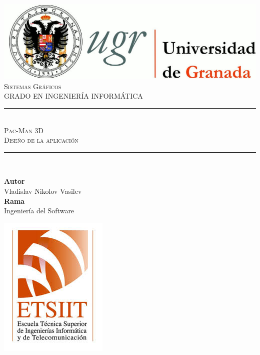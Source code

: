 \documentclass[11pt,a4paper]{article}
\newcommand{\asignatura}{Sistemas Gráficos}
\newcommand{\autor}{Vladislav Nikolov Vasilev}
\newcommand{\titulo}{Pac-Man 3D}
\newcommand{\subtitulo}{Diseño de la aplicación}
\newcommand{\rama}{Ingeniería del Software}
\begin{document}

\begin{titlepage}

\begin{minipage}{\textwidth}

\centering

\includegraphics[scale=0.3]{img/logo_ugr.jpg}\\[1cm]

\textsc{\Large \asignatura{}\\[0.2cm]}
\textsc{GRADO EN INGENIERÍA INFORMÁTICA}\\[1cm]

\noindent\rule[-1ex]{\textwidth}{1pt}\\[1.5ex]
\textsc{{\Huge \titulo\\[0.5ex]}}
\textsc{{\Large \subtitulo\\}}
\noindent\rule[-1ex]{\textwidth}{2pt}\\[3.5ex]

\end{minipage}

\vspace{0.7cm}

\begin{minipage}{\textwidth}

\centering

\textbf{Autor}\\ {\autor{}}\\[2.5ex]
\textbf{Rama}\\ {\rama}\\[2.5ex]
\vspace{0.3cm}

\includegraphics[scale=0.3]{img/etsiit.jpeg}


\end{minipage}
\end{titlepage}
\end{document}
